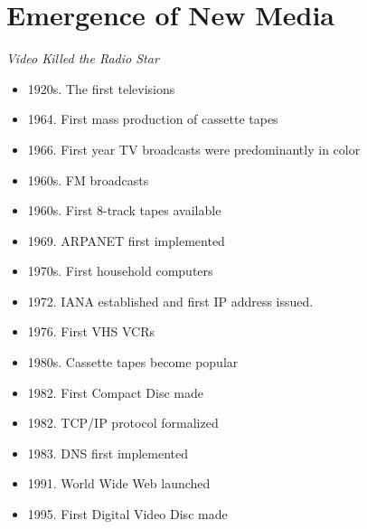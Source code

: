 \section{Emergence of New Media}
\begin{frame}{\emph{Video Killed the Radio Star}}
	\begin{itemize}
		\item<+->1920s. The first televisions
		\item<+->1964. First mass production of cassette tapes
		\item<+->1966. First year TV broadcasts were predominantly in color
		\item<+->1960s. FM broadcasts
		\item<+->1960s. First 8-track tapes available
		\item<+->1969. ARPANET first implemented
		\item<+->1970s. First household computers
		\item<+->1972. IANA established and first IP address issued.
		\item<+->1976. First VHS VCRs
		\item<+->1980s. Cassette tapes become popular
		\item<+->1982. First Compact Disc made
		\item<+->1982. TCP/IP protocol formalized
		\item<+->1983. DNS first implemented
		\item<+->1991. World Wide Web launched
		\item<+->1995. First Digital Video Disc made
	\end{itemize}

\end{frame}


